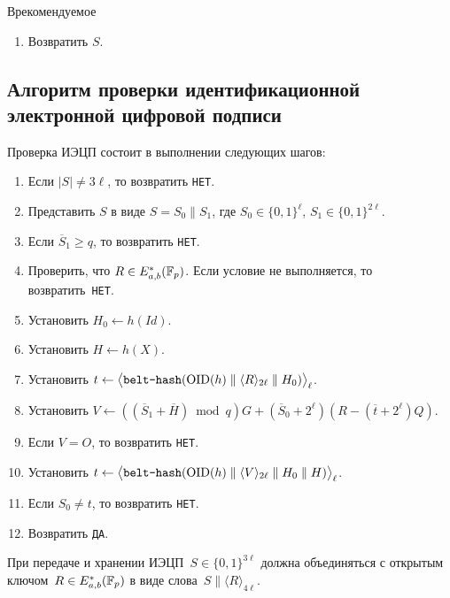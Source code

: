 \begin{appendix}{В}{рекомендуемое}
\begin{enumerate}
\item
Возвратить $S$.
\end{enumerate}

\subsection{Алгоритм проверки идентификационной 
электронной цифровой подписи}
\label{IBS.Verify}

Проверка ИЭЦП состоит 
в выполнении следующих шагов:
\begin{enumerate}
\item
Если $|S|\neq 3\ell$,
то возвратить \texttt{НЕТ}.

\item
Представить $S$ в виде $S=S_0\parallel S_1$,
где $S_0\in\{0,1\}^\ell$, $S_1\in\{0,1\}^{2\ell}$.

\item
Если $\overline{S}_1\geq q$,
то возвратить \texttt{НЕТ}.

\item
Проверить, что $R\in E_{a,b}^*(\mathbb{F}_p)$.
Если условие не выполняется, то возвратить~\texttt{НЕТ}.

\item
Установить $H_0\leftarrow h(Id)$.

\item
Установить $H\leftarrow h(X)$.

\item
Установить $t\leftarrow
\bigl\langle\texttt{belt-hash}
(\text{\normalfont OID}(h)\parallel\langle R\rangle_{2\ell}\parallel H_0)
\bigr\rangle_\ell$.

\item
Установить
$V\leftarrow \left((\overline{S}_1+\overline{H})\bmod q\right)G+
(\overline{S}_0+2^\ell)(R-(\overline{t} + 2^\ell)Q)$.

\item
Если $V=O$, то возвратить \texttt{НЕТ}.
         
\item
Установить $t\leftarrow
\bigl\langle\texttt{belt-hash}
(\text{\normalfont OID}(h)\parallel\langle V\rangle_{2\ell}\parallel H_0\parallel H)
\bigr\rangle_\ell$.

\item
Если $S_0\neq t$,
то возвратить \texttt{НЕТ}.

\item
Возвратить \texttt{ДА}.
\end{enumerate}
               

\label{IBS.Format}

При передаче и хранении ИЭЦП~$S\in\{0,1\}^{3\ell}$
должна объединяться с открытым ключом~$R\in E_{a,b}^*(\mathbb{F}_p)$ 
в виде слова~$S\parallel\langle R\rangle_{4\ell}$.

\end{appendix}
